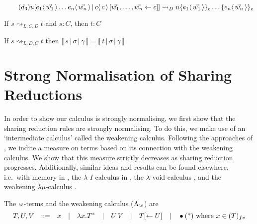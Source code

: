 \documentclass[a4paper,UKenglish,cleveref, autoref]{lipics-v2019}
\newcommand{\WEAK}{\Lambda_{\weaksymbol}}
\newcommand{\fv}[1]{(#1)_{fv}}
\newcommand{\abs}[2]{\lambda #1 . #2}
\newcommand{\app}[2]{#1 \, #2}
\newcommand{\share}[3]{#1 [#2 \leftarrow #3]}
\newcommand{\dist}[5]{#1 [ #2 \, \vert \, \fakedist{#4}{#5} \, #3 ]}
\newcommand{\fakedist}[2]{#1 \langle \, #2 \, \rangle}
\newcommand{\exor}[3]{#1 \{ \fakedist{#2}{#3} \}_{e}}
\newcommand{\weaksymbol}{\mbox{\tiny $\mathcal{W}$}}
\newcommand{\readbackwmap}[3]{\llbracket \, #1 \, \vert \, #2 \, \vert \, #3  \, \rrbracket }
\newcommand{\distrule}{d}
\newcommand{\sharerule}{\triangle}
\newcommand{\lamrule}{\lambda}
\begin{document}
\begin{equation} \label{red:distelim} \tag{$d_{3}$}
\dist{u}{\fakedist{e_{1}}{\vec{w_{1}}} \dots \fakedist{e_{n}}{\vec{w_{n}}}}{\share{}{\vec{w_{1}}, \dots, \vec{w_{n}}}{c}}{c}{c} \rightsquigarrow_{D} \exor{\exor{u}{e_{1}}{\vec{w_{1}}} \dots}{e_{n}}{\vec{w_{n}}}
\end{equation}
\begin{center}
\drv{ ; -[\lamrule] ; A \rightarrow \drv{A ; -[\sharerule] ; A \wedge A} ; -[\distrule] ; (A \rightarrow A) \wedge (A \rightarrow A)}
\hspace{0.5cm}
\drv{\drv{ ; -[\lamrule] ; A \rightarrow A} \wedge \drv{ ; -[\lamrule] ; A \rightarrow A}}
\end{center}

\begin{proposition}
If $s \rightsquigarrow_{L, C, D} t$ and $s : C$, then $t : C$
\end{proposition}

\begin{lemma}
\label{lem:preservesdenotation}
 If $s \rightsquigarrow_{L, D, C} t$ then $\readbackwmap{s}{\sigma}{\gamma} = \readbackwmap{t}{\sigma}{\gamma}$
\end{lemma}

\section{Strong Normalisation of Sharing Reductions}

In order to show our calculus is strongly normalising, we first show that the sharing reduction rules are strongly normalising. To do this, we make use of an `intermediate calculus' called the weakening calculus. Following the approaches of \cite{gundersen2013atomic}, we indite a measure on terms based on its connection with the weakening calculus. We show that this measure strictly decreases as sharing reduction progresses. Additionally, similar ideas and results can be found elsewhere, i.e.\ with memory in \cite{klop1980thesis}, the $\lambda$-$I$ calculus in \cite{barendregt1984lambda}, the $\lambda$-void calculus \cite{kesneraccattoli12}, and the weakening $\lambda\mu$-calculus \cite{he2018atomic}.


\begin{definition}
\label{def:weakterms}
The $\weaksymbol$-terms and the weakening calculus ($\WEAK$) are
\begin{equation*}
	T, U, V \quad {:}{:}{=} \quad x \quad \vert \quad \abs{x}{T^{*}}\quad \vert \quad \app{U}{V} \quad \vert \quad \share{T}{}{U} \quad \vert \quad \bullet \hfill \text{(*) where $x \in \fv{T}$}
\end{equation*}
\end{definition}
\end{document}
